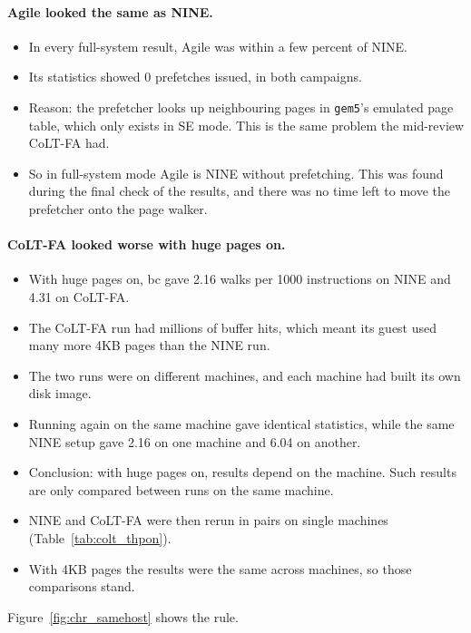 \paragraph{Agile looked the same as NINE.}
\begin{itemize}
    \item In every full-system result, Agile was within a few percent of NINE.
    \item Its statistics showed 0 prefetches issued, in both campaigns.
    \item Reason: the prefetcher looks up neighbouring pages in \texttt{gem5}'s emulated page table, which only exists in SE mode. This is the same problem the mid-review CoLT-FA had.
    \item So in full-system mode Agile is NINE without prefetching. This was found during the final check of the results, and there was no time left to move the prefetcher onto the page walker.
\end{itemize}

\paragraph{CoLT-FA looked worse with huge pages on.}
\begin{itemize}
    \item With huge pages on, bc gave 2.16 walks per 1000 instructions on NINE and 4.31 on CoLT-FA.
    \item The CoLT-FA run had millions of buffer hits, which meant its guest used many more 4KB pages than the NINE run.
    \item The two runs were on different machines, and each machine had built its own disk image.
    \item Running again on the same machine gave identical statistics, while the same NINE setup gave 2.16 on one machine and 6.04 on another.
    \item Conclusion: with huge pages on, results depend on the machine. Such results are only compared between runs on the same machine.
    \item NINE and CoLT-FA were then rerun in pairs on single machines (Table~\ref{tab:colt_thpon}).
    \item With 4KB pages the results were the same across machines, so those comparisons stand.
\end{itemize}
Figure~\ref{fig:chr_samehost} shows the rule.

